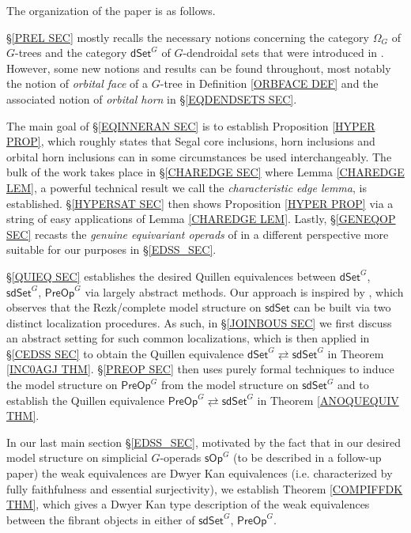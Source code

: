 \documentclass[a4paper,10pt
]{article}%
\begin{document}
\vskip 10pt

The organization of the paper is as follows.

\S \ref{PREL SEC} mostly recalls the necessary notions concerning the category $\Omega_G$ of $G$-trees and the category $\mathsf{dSet}^G$ of $G$-dendroidal sets 
that were introduced in \cite{Per17}.
However, some new notions and results can be found throughout, most notably the notion of \textit{orbital face} of a $G$-tree in Definition \ref{ORBFACE DEF}
and the associated notion of \textit{orbital horn} in 
\S \ref{EQDENDSETS SEC}.

The main goal of \S \ref{EQINNERAN SEC} is to establish
Proposition \ref{HYPER PROP},
which roughly states that Segal core inclusions, horn inclusions and orbital horn inclusions can in some circumstances be used interchangeably.
The bulk of the work takes place in 
\S \ref{CHAREDGE SEC} where Lemma \ref{CHAREDGE LEM},
a powerful technical result we call the
\textit{characteristic edge lemma}, is established.
\S \ref{HYPERSAT SEC} then shows Proposition \ref{HYPER PROP} via a string of easy applications of 
Lemma \ref{CHAREDGE LEM}.
Lastly, \S \ref{GENEQOP SEC} recasts the \textit{genuine equivariant operads} of \cite{BP17} in a different perspective more suitable for our purposes in \S \ref{EDSS_SEC}.

\S \ref{QUIEQ SEC} establishes the desired Quillen equivalences between 
$\mathsf{dSet}^G$, $\mathsf{sdSet}^G$, $\mathsf{PreOp}^G$
via largely abstract methods.
Our approach is inspired by 
\cite[Thm. 6.6]{CM13a}, which observes that the Rezk/complete model structure on $\mathsf{sdSet}$ can be built via two distinct localization procedures.
As such, in \S \ref{JOINBOUS SEC} we first discuss an abstract setting for such common localizations, 
which is then applied in \S \ref{CEDSS SEC} to obtain the Quillen equivalence
$\mathsf{dSet}^G \rightleftarrows \mathsf{sdSet}^G$
in Theorem \ref{INC0AGJ THM}.
\S \ref{PREOP SEC} then uses purely formal techniques to induce the model structure on
$\mathsf{PreOp}^G$ from the model structure on
$\mathsf{sdSet}^G$
and to establish the Quillen equivalence
$\mathsf{PreOp}^G \rightleftarrows \mathsf{sdSet}^G$
in Theorem \ref{ANOQUEQUIV THM}.

In our last main section \S \ref{EDSS_SEC},
motivated by the fact that in our desired model structure on simplicial $G$-operads $\mathsf{sOp}^G$
(to be described in a follow-up paper)
the weak equivalences are Dwyer Kan equivalences
(i.e. characterized by fully faithfulness and essential surjectivity), 
we establish Theorem \ref{COMPIFFDK THM}, which gives a Dwyer Kan type description of the weak equivalences 
between the fibrant objects in either of $\mathsf{sdSet}^G$, $\mathsf{PreOp}^G$.
\end{document}
